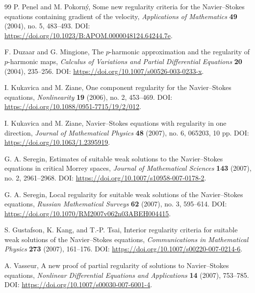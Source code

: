 \documentclass[11pt]{article}
\numberwithin{equation}{section}
\theoremstyle{plain}
\theoremstyle{definition}
\theoremstyle{remark}
\begin{document}
\begin{thebibliography}{99}
	P. Penel and M. Pokorn\'y,
	Some new regularity criteria for the Navier--Stokes equations containing gradient of the velocity,
	\newblock \emph{Applications of Mathematics} \textbf{49} (2004), no. 5, 483--493.
	\newblock DOI: \url{https://doi.org/10.1023/B:APOM.0000048124.64244.7e}.

	F. Duzaar and G. Mingione,
	The $p$-harmonic approximation and the regularity of $p$-harmonic maps,
	\newblock \emph{Calculus of Variations and Partial Differential Equations} \textbf{20} (2004), 235--256.
	\newblock DOI: \url{https://doi.org/10.1007/s00526-003-0233-x}.

	I. Kukavica and M. Ziane,
	One component regularity for the Navier--Stokes equations,
	\newblock \emph{Nonlinearity} \textbf{19} (2006), no. 2, 453--469.
	\newblock DOI: \url{https://doi.org/10.1088/0951-7715/19/2/012}.

	I. Kukavica and M. Ziane,
	Navier--Stokes equations with regularity in one direction,
	\newblock \emph{Journal of Mathematical Physics} \textbf{48} (2007), no. 6, 065203, 10 pp.
	\newblock DOI: \url{https://doi.org/10.1063/1.2395919}.

	G. A. Seregin,
	Estimates of suitable weak solutions to the Navier--Stokes equations in critical Morrey spaces,
	\newblock \emph{Journal of Mathematical Sciences} \textbf{143} (2007), no. 2, 2961--2968.
	\newblock DOI: \url{https://doi.org/10.1007/s10958-007-0178-2}.

	G. A. Seregin,
	Local regularity for suitable weak solutions of the Navier--Stokes equations,
	\newblock \emph{Russian Mathematical Surveys} \textbf{62} (2007), no. 3, 595--614.
	\newblock DOI: \url{https://doi.org/10.1070/RM2007v062n03ABEH004415}.

	S. Gustafson, K. Kang, and T.-P. Tsai,
	Interior regularity criteria for suitable weak solutions of the Navier--Stokes equations,
	\newblock \emph{Communications in Mathematical Physics} \textbf{273} (2007), 161--176.
	\newblock DOI: \url{https://doi.org/10.1007/s00220-007-0214-6}.

	A. Vasseur,
	A new proof of partial regularity of solutions to Navier--Stokes equations,
	\newblock \emph{Nonlinear Differential Equations and Applications} \textbf{14} (2007), 753--785.
	\newblock DOI: \url{https://doi.org/10.1007/s00030-007-6001-4}.


\end{thebibliography}
\end{document}
